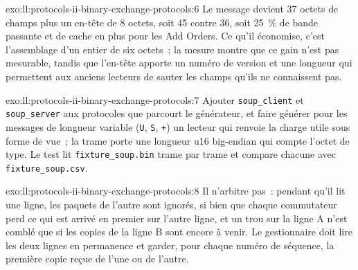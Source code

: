 \begin{solution}{exo:ll:protocols-ii-binary-exchange-protocols:6}
Le message devient 37 octets de champs plus un en-tête de 8 octets, soit 45 contre 36, soit 25~\% de bande passante et de cache en plus pour les Add Orders.
Ce qu'il économise, c'est l'assemblage d'un entier de six octets~; la mesure montre que ce gain n'est pas mesurable, tandis que
l'en-tête apporte un numéro de version et une longueur qui permettent aux anciens lecteurs de sauter les champs qu'ils ne connaissent pas.
\end{solution}

\begin{solution}{exo:ll:protocols-ii-binary-exchange-protocols:7}
Ajouter \texttt{soup\_client} et \texttt{soup\_server} aux protocoles que parcourt le générateur, et faire générer pour les messages
de longueur variable (\texttt{U}, \texttt{S}, \texttt{+}) un lecteur qui renvoie la charge utile sous forme de vue~; la trame porte une longueur u16 big-endian
qui compte l'octet de type. Le test lit \texttt{fixture\_soup.bin} trame par trame et compare chacune avec
\texttt{fixture\_soup.csv}.
\end{solution}

\begin{solution}{exo:ll:protocols-ii-binary-exchange-protocols:8}
Il n'arbitre pas~: pendant qu'il lit une ligne, les paquets de l'autre sont ignorés, si bien que chaque commutateur perd ce qui
est arrivé en premier sur l'autre ligne, et un trou sur la ligne A n'est comblé que si les copies de la ligne B sont encore à venir. Le gestionnaire doit lire les deux lignes
en permanence et garder, pour chaque numéro de séquence, la première copie reçue de l'une ou de l'autre.
\end{solution}

